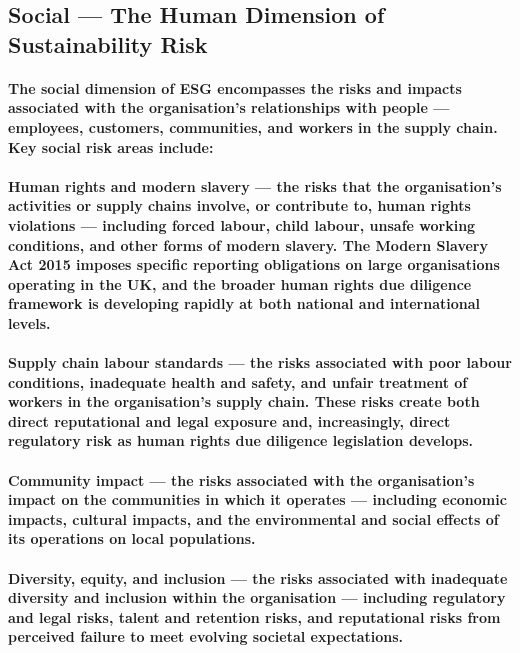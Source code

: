 \subsection{Social — The Human Dimension of Sustainability Risk}
\paragraph{The social dimension of ESG encompasses the risks and impacts associated with the organisation's relationships with people — employees, customers, communities, and workers in the supply chain. Key social risk areas include:}
\paragraph{\textbf{Human rights and modern slavery} — the risks that the organisation's activities or supply chains involve, or contribute to, human rights violations — including forced labour, child labour, unsafe working conditions, and other forms of modern slavery. The \textbf{Modern Slavery Act 2015} imposes specific reporting obligations on large organisations operating in the UK, and the broader human rights due diligence framework is developing rapidly at both national and international levels.}
\paragraph{\textbf{Supply chain labour standards} — the risks associated with poor labour conditions, inadequate health and safety, and unfair treatment of workers in the organisation's supply chain. These risks create both direct reputational and legal exposure and, increasingly, direct regulatory risk as human rights due diligence legislation develops.}
\paragraph{\textbf{Community impact} — the risks associated with the organisation's impact on the communities in which it operates — including economic impacts, cultural impacts, and the environmental and social effects of its operations on local populations.}
\paragraph{\textbf{Diversity, equity, and inclusion} — the risks associated with inadequate diversity and inclusion within the organisation — including regulatory and legal risks, talent and retention risks, and reputational risks from perceived failure to meet evolving societal expectations.}

